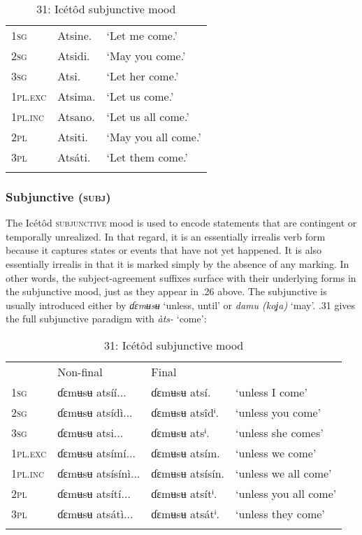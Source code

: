 \begin{table}
\begin{table}
\caption{30: Icétôd optative mood}
\label{tab:8}


\begin{tabularx}{\textwidth}{XXX}
\lsptoprule

\textsc{1sg} & Atsine. & ‘Let me come.’\\
\textsc{2sg} & Atsidi. & ‘May you come.’\\
\textsc{3sg} & Atsi. & ‘Let her come.’\\
\textsc{1pl.exc} & Atsima. & ‘Let us come.’\\
\textsc{1pl.inc} & Atsano. & ‘Let us all come.’\\
\textsc{2pl} & Atsiti. & ‘May you all come.’\\
\textsc{3pl} & Atsáti. & ‘Let them come.’\\
\lspbottomrule
\end{tabularx}
\end{table}

\subsubsection{Subjunctive (\textsc{subj})}

The Icétôd \textsc{subjunctive} mood is used to encode statements that are contingent or temporally unrealized. In that regard, it is an essentially irrealis verb form because it captures states or events that have not yet happened. It is also essentially irrealis in that it is marked simply by the absence of any marking. In other words, the subject-agreement suffixes surface with their underlying forms in the subjunctive mood, just as they appear in .26 above. The subjunctive is usually introduced either by \textit{ɗɛmʉsʉ }‘unless, until’ or \textit{damu (koʝa)} ‘may’. .31 gives the full subjunctive paradigm with \textit{àts- }‘come’:


\begin{table}
\caption{31: Icétôd subjunctive mood}
\label{tab:8}


\begin{tabularx}{\textwidth}{XXXX} & Non-final & Final & \\
\lsptoprule
\textsc{1sg} & ɗɛmʉsʉ atsíí... & ɗɛmʉsʉ atsí. & ‘unless I come’\\
\textsc{2sg} & ɗɛmʉsʉ atsídì... & ɗɛmʉsʉ atsîdⁱ. & ‘unless you come’\\
\textsc{3sg} & ɗɛmʉsʉ atsi... & ɗɛmʉsʉ atsⁱ. & ‘unless she comes’\\
\textsc{1pl.exc} & ɗɛmʉsʉ atsímí... & ɗɛmʉsʉ atsím. & ‘unless we come’\\
\textsc{1pl.inc} & ɗɛmʉsʉ atsísínì... & ɗɛmʉsʉ atsísín. & ‘unless we all come’\\
\textsc{2pl} & ɗɛmʉsʉ atsítí... & ɗɛmʉsʉ atsítⁱ. & ‘unless you all come’\\
\textsc{3pl} & ɗɛmʉsʉ atsátì... & ɗɛmʉsʉ atsátⁱ. & ‘unless they come’\\
\lspbottomrule
\end{tabularx}
\end{table}


\end{table}
